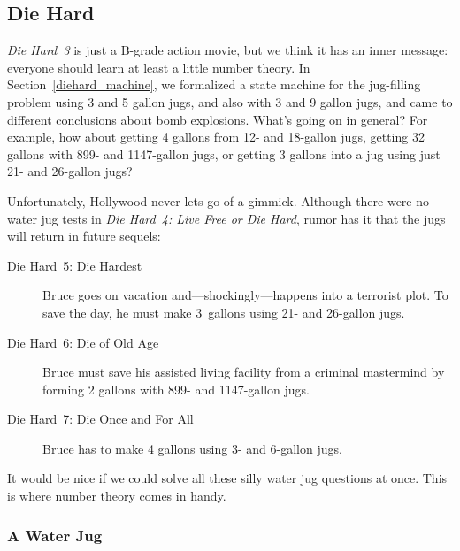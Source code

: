 \subsection{Die Hard}

\emph{Die Hard~3} is just a B-grade action movie, but we think it has
an inner message: everyone should learn at least a little number
theory.  In Section~\ref{diehard_machine}, we formalized a state
machine for the  jug-filling problem using 3 and 5
gallon jugs, and also with 3 and 9 gallon jugs, and came to different
conclusions about bomb explosions.  What's going on in general?  For
example, how about getting 4 gallons from 12- and 18-gallon jugs,
getting 32 gallons with 899- and 1147-gallon jugs, or getting 3
gallons into a jug using just 21- and 26-gallon jugs?

\begin{editingnotes}
Unfortunately, Hollywood never lets go of a gimmick.  Although there
were no water jug tests in \emph{Die Hard~4: Live Free or Die Hard},
rumor has it that the jugs will return in future sequels:
\begin{description}

\item[Die Hard~5: Die Hardest] Bruce goes on vacation and---shockingly---happens into a
  terrorist plot.  To save the day, he must make 3~gallons using 21- and 26-gallon jugs.

\item[Die Hard~6: Die of Old Age] Bruce must save his assisted living facility from a
  criminal mastermind by forming 2 gallons with 899- and 1147-gallon jugs.

\item[Die Hard~7: Die Once and For All] Bruce has to make 4 gallons using 3- and 6-gallon
  jugs.

\end{description}
\end{editingnotes}

It would be nice if we could solve all these silly water jug questions at once.  \iffalse
In particular, how can one form $g$ gallons using jugs with capacities $a$ and~$b$?\fi This
is where number theory comes in handy.

\subsubsection{A Water Jug }\label{jug_invar_subsubsec}

